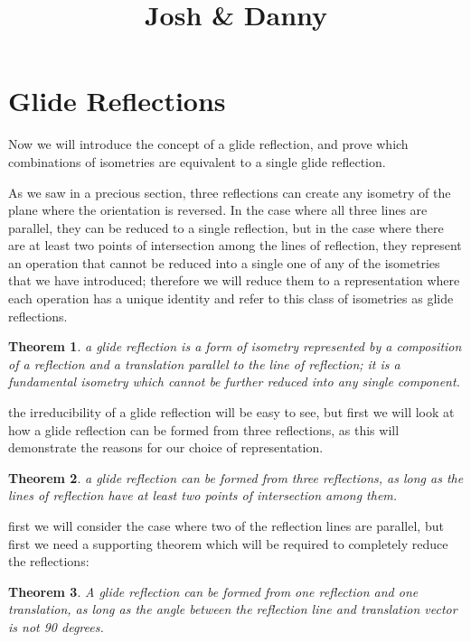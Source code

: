 \documentclass[11pt]{article}
\newtheorem{theorem}{Theorem}[section]
\theoremstyle{definition}
\begin{document}


\title{Josh \& Danny}

\maketitle

\section{Glide Reflections}
Now we will introduce the concept of a glide reflection, and prove which
combinations of isometries are equivalent to a single glide reflection.

As we saw in a precious section, three reflections can create any isometry of
the plane where the orientation is reversed. In the case where all three lines
are parallel, they can be reduced to a single reflection, but in the case where
there are at least two points of intersection among the lines of reflection,
they represent an operation that cannot be reduced into a single one of any of
the isometries that we have introduced; therefore we will reduce them to a
representation where each operation has a unique identity and refer to this
class of isometries as glide reflections.

\begin{theorem}\label{glide reflection}
  a glide reflection is a form of isometry represented by a composition of a
reflection and a translation parallel to the line of reflection; it is a
fundamental isometry which cannot be further reduced into any single component.
\end{theorem}

the irreducibility of a glide reflection will be easy to see, but first we will
look at how a glide reflection can be formed from three reflections, as this
will demonstrate the reasons for our choice of representation.

\begin{theorem}\label{3 reflections form a glide reflection}
  a glide reflection can be formed from three reflections, as long as the
  lines of reflection have at least two points of intersection among them.
\end{theorem}

first we will consider the case where two of the reflection lines are parallel,
but first we need a supporting theorem which will be required to completely
reduce the reflections:

\begin{theorem}\label{glide reflection from a reflection and a translation}
  A glide reflection can be formed from one reflection and one translation,
  as long as the angle between the reflection line and translation vector is
  not 90 degrees.
\end{theorem}
\end{document}
